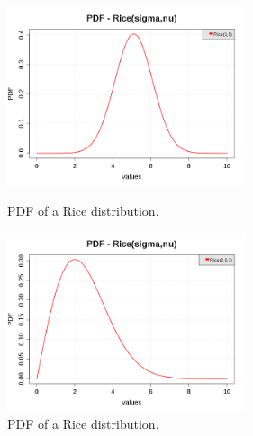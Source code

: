 \begin{figure}[H]
  \begin{minipage}{10cm}
    \begin{center}
      \includegraphics[width=7cm]{pdf_Rice_1.png}
      \caption{PDF of a Rice distribution.}
      \label{PDFRice1}
    \end{center}
  \end{minipage}
  \hfill
  \begin{minipage}{10cm}
    \begin{center}
      \includegraphics[width=7cm]{pdf_Rice_2.png}
      \caption{PDF of a Rice distribution.}
      \label{PDFRice2}
    \end{center}
  \end{minipage}
\end{figure}


